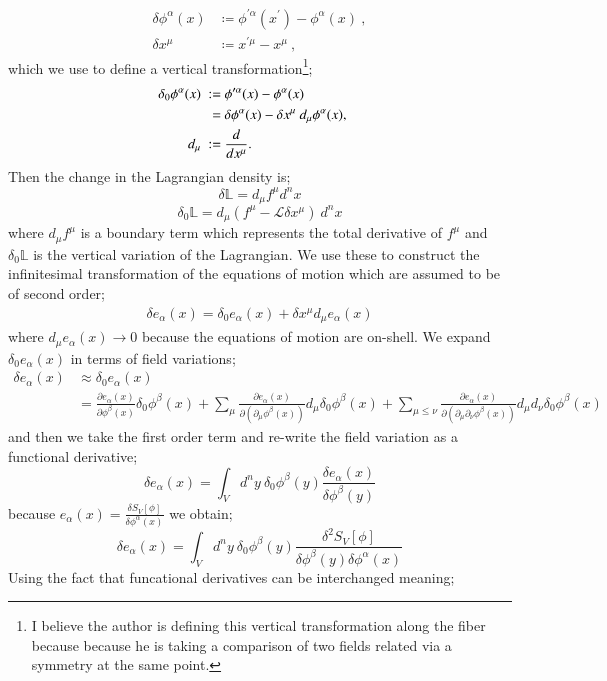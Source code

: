 \documentclass{article}
\begin{document}
\begin{align*}
	\delta \phi^\alpha(x) &\coloneqq \phi^{\prime \alpha}(x^\prime) - \phi^\alpha (x)\ , \\
	\delta x^\mu & \coloneqq x^{\prime \mu} - x^\mu \ ,
\end{align*}
which we use to define a vertical transformation\footnote{I believe the author is defining this vertical transformation along the fiber because because he is taking a comparison of two fields related via a symmetry at the same point.};
\begin{align}
	\delta_0 \phi^{\alpha}(x)~:=~&\phi^{\prime \alpha}(x)-\phi^{\alpha}(x)\cr
~=~&\delta \phi^{\alpha}(x)-\delta x^{\mu} ~d_{\mu}\phi^{\alpha}(x),\cr
d_{\mu}~:=~&\frac{d}{dx^{\mu}}.
\end{align}
Then the change in the Lagrangian density is;
\[
	\delta \mathbb{L} = d_\mu f^\mu d^nx
\]
\[
	\delta_0 \mathbb{L} = d_\mu \left(f^\mu - \mathcal{L}\delta x^\mu\right)\ d^nx
\]
where $d_\mu f^\mu$ is a boundary term which represents the total derivative of $f^\mu$ and $\delta_0 \mathbb{L}$ is the vertical variation of the Lagrangian. We use these to construct the infinitesimal transformation of the equations of motion which are assumed to be of second order;
\begin{align*}
	\delta e_\alpha(x) = \delta_0 e_\alpha(x) + \delta x^\mu d_\mu e_\alpha(x)
\end{align*}
where $d_\mu e_\alpha(x) \to 0$ because the equations of motion are on-shell. We expand $\delta_0 e_\alpha(x)$ in terms of field variations;
\begin{align*}
	\delta e_\alpha(x) &\approx \delta_0 e_\alpha(x) \\
	&= \frac{\partial e_{\alpha}(x)}{\partial\phi^{\beta}(x)}\delta_0\phi^{\beta}(x) +\sum_{\mu}\frac{\partial e_{\alpha}(x)}{\partial(\partial_{\mu}\phi^{\beta}(x))}d_{\mu}\delta_0\phi^{\beta}(x) +\sum_{\mu\leq \nu }\frac{\partial e_{\alpha}(x)}{\partial(\partial_{\mu}\partial_{\nu}\phi^{\beta}(x))}d_{\mu}d_{\nu}\delta_0\phi^{\beta}(x)
\end{align*}
and then we take the first order term and re-write the field variation as a functional derivative;
\[
	\delta e_\alpha(x) = \int_V\! d^ny~ \delta_0\phi^{\beta}(y)\frac{\delta e_{\alpha}(x)}{\delta \phi^{\beta}(y)}
\]
because $e_\alpha(x) = \frac{\delta S_V\left[\phi\right]}{\delta \phi^\alpha(x)}$ we obtain;
\[
	\delta e_\alpha(x) = \int_V\! d^ny~ \delta_0\phi^{\beta}(y)\frac{\delta^2 S_V[\phi]}{\delta \phi^{\beta}(y)\delta \phi^{\alpha}(x)}
\]
Using the fact that funcational derivatives can be interchanged meaning;
\end{document}
